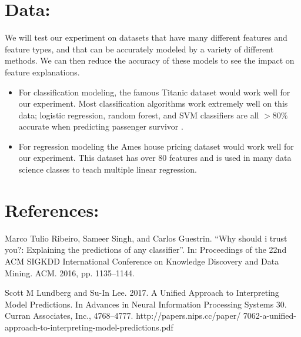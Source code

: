 \documentclass{article}
\begin{document}
\begin{normalsize}
    	\section{Data:} 
    	We will test our experiment on datasets that have many different features and feature types, and that can be accurately modeled by a variety of different methods. We can then reduce the accuracy of these models to see the impact on feature explanations.
    	\begin{itemize}
    	\item For classification modeling, the famous Titanic dataset would work well for our experiment. Most classification algorithms work extremely well on this data; logistic regression, random forest, and SVM classifiers are all $>80\%$ accurate when predicting passenger survivor .
    	\item For regression modeling the Ames house pricing dataset would work well for our experiment. This dataset has over 80 features and is used in many data science classes to teach multiple linear regression.

    	\end{itemize}
        
	   	\section{References:}
	   	
	   	Marco Tulio Ribeiro, Sameer Singh, and Carlos Guestrin. “Why should i trust you?: Explaining
the predictions of any classifier”. In: Proceedings of the 22nd ACM SIGKDD International
Conference on Knowledge Discovery and Data Mining. ACM. 2016, pp. 1135–1144.

\vspace{5mm}
\noindent
Scott M Lundberg and Su-In Lee. 2017. A Unified Approach to Interpreting Model Predictions. In Advances in Neural Information Processing Systems 30. Curran Associates, Inc., 4768–4777. http://papers.nips.cc/paper/
7062-a-unified-approach-to-interpreting-model-predictions.pdf



\end{normalsize}
\end{document}

